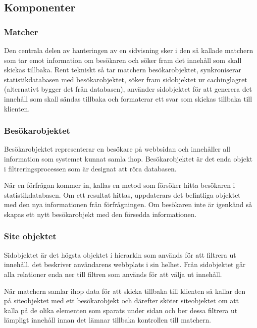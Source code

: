 \subsection{Komponenter}


\subsubsection{Matcher}

Den centrala delen av hanteringen av en sidvisning sker i den så kallade matchern som tar emot information om besökaren och söker fram det innehåll som skall skickas tillbaka. Rent tekniskt så tar matchern besökarobjektet, synkroniserar statistikdatabasen med besökarobjektet, söker fram sidobjektet ur cachinglagret (alternativt bygger det från databasen), använder sidobjektet för att generera det innehåll som skall sändas tillbaka och formaterar ett svar som skickas tillbaka till klienten.

\subsubsection{Besökarobjektet}

Besökarobjektet representerar en besökare på webbsidan och innehåller all information som systemet kunnat samla ihop. Besökarobjektet är det enda objekt i filtreringsprocessen som är designat att röra databasen.

När en förfrågan kommer in, kallas en metod som försöker hitta besökaren i statistikdatabasen. Om ett resultat hittas, uppdaterars det befintliga objektet med den nya informationen från förfrågningen. Om besökaren inte är igenkänd så skapas ett nytt besökarobjekt med den försedda informationen.

\subsubsection{Site objektet}



Sidobjektet är det högsta objektet i hierarkin som används för att filtrera ut innehåll. det beskriver användarens webbplats i sin helhet. Från sidobjektet går alla relationer enda ner till filtren som används för att välja ut innehåll.

När matchern samlar ihop data för att skicka tillbaka till klienten så kallar den på siteobjektet med ett besökarobjekt och därefter sköter siteobjektet om att kalla på de olika elementen som sparats under sidan och ber dessa filtrera ut lämpligt innehåll innan det lämnar tillbaka kontrollen till matchern.

